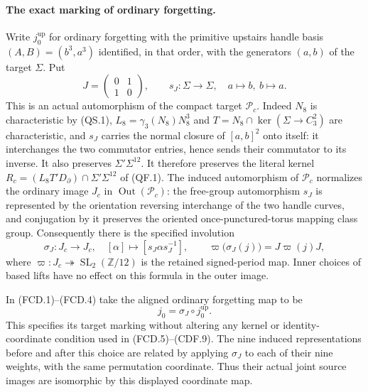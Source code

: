 \paragraph{The exact marking of ordinary forgetting.}
Write $j_0^{\mathrm{up}}$ for ordinary forgetting with the primitive
upstairs handle basis $(A,B)=(b^3,a^3)$ identified, in that order, with
the generators $(a,b)$ of the target $\Sigma$.  Put
\[
 J=\begin{pmatrix}0&1\\1&0\end{pmatrix},\qquad
 s_J:\Sigma\longrightarrow\Sigma,\quad a\longmapsto b,\ b\longmapsto a.
                                                               \tag{MFP.1}
\]
This is an actual automorphism of the compact target
$\mathcal P_c$.  Indeed $N_8$ is characteristic by (QS.1),
$L_8=\gamma_3(N_8)N_8^3$ and
$T=N_8\cap\ker(\Sigma\to C_3^2)$ are characteristic, and $s_J$
carries the normal closure of $[a,b]^2$ onto itself: it interchanges
the two commutator entries, hence sends their commutator to its inverse.
It also preserves $\Sigma'\Sigma^{12}$.  It therefore preserves the
literal kernel $R_c=(L_8T'D_\partial)\cap\Sigma'\Sigma^{12}$
of (QF.1).  The induced automorphism of $\mathcal P_c$ normalizes
the ordinary image $J_c$ in $\operatorname{Out}(\mathcal P_c)$:
the free-group automorphism $s_J$ is represented by the orientation
reversing interchange of the two handle curves, and conjugation by it
preserves the oriented once-punctured-torus mapping class group.
Consequently there is the specified involution
\[
 \sigma_J:J_c\longrightarrow J_c,\quad
 [\alpha]\longmapsto[s_J\alpha s_J^{-1}],\qquad
 \varpi\bigl(\sigma_J(j)\bigr)=J\varpi(j)J,
                                                               \tag{MFP.2}
\]
where $\varpi:J_c\twoheadrightarrow\operatorname{SL}_2(\mathbb Z/12)$
is the retained signed-period map.  Inner choices of based lifts have
no effect on this formula in the outer image.

In (FCD.1)--(FCD.4) take the aligned ordinary forgetting map to be
\[
                  j_0=\sigma_J\circ j_0^{\mathrm{up}}.
                                                               \tag{MFP.3}
\]
This specifies its target marking without altering any kernel or
identity-coordinate condition used in (FCD.5)--(CDF.9).  The nine induced
representations before and after this choice are related by applying
$\sigma_J$ to each of their nine weights, with the same permutation
coordinate.  Thus their actual joint source images are isomorphic by
this displayed coordinate map.

